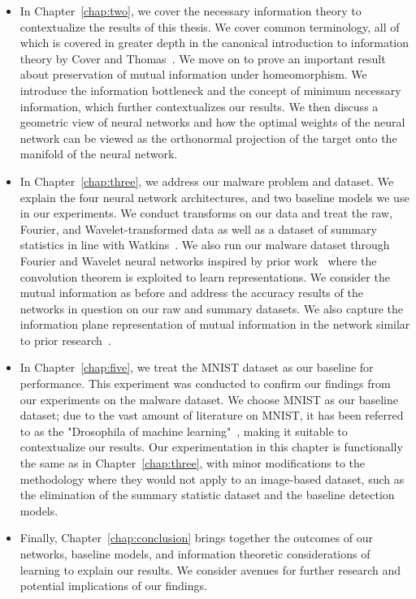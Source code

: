 \begin{itemize}
	\item In Chapter~\ref{chap:two}, we cover the necessary information theory to contextualize the results of this thesis. We cover common terminology, all of which is covered in greater depth in the canonical introduction to information theory by Cover and Thomas~\cite{coverthomas2006}. We move on to prove an important result about preservation of mutual information under homeomorphism. We introduce the information bottleneck and the concept of minimum necessary information,  which further contextualizes our results. We then discuss a geometric view of neural networks and how the optimal weights of the neural network can be viewed  as the orthonormal projection of the target onto the manifold of the neural network.
	\item In Chapter~\ref{chap:three}, we address our malware problem and dataset. We explain the four neural network architectures, and two baseline models we use in our experiments. We conduct transforms on our data and treat the raw, Fourier, and Wavelet-transformed data as well as a dataset of summary statistics in line with Watkins~\cite{watkins2013using}. We also run our malware dataset through Fourier and Wavelet neural networks inspired by prior work~\cite{pratt2017fcnn, fujieda2017wavelet} where the convolution theorem is exploited to learn representations. We consider the mutual information as before and address the accuracy results of the networks in question on our raw and summary datasets. We also capture the information plane representation of mutual information in the network similar to prior research~\cite{shwartz2017opening, saxe2019information}.
	\item In Chapter~\ref{chap:five}, we treat the MNIST dataset as our baseline for performance. This experiment was conducted to confirm our findings from our experiments on the malware dataset. We choose MNIST as our baseline dataset; due to the vast amount of literature on MNIST, it has been referred to as the "Drosophila of machine learning"~\cite{goodfellow2016deep}, making it suitable to contextualize our results. Our experimentation in this chapter is functionally the same as in Chapter~\ref{chap:three}, with minor modifications to the methodology where they would not apply to an image-based dataset, such as the elimination of the summary statistic dataset and the baseline detection models.
	\item Finally, Chapter~\ref{chap:conclusion} brings together the outcomes of our networks, baseline models, and information theoretic considerations of learning to explain our results. We consider avenues for further research and potential implications of our findings.
\end{itemize}
